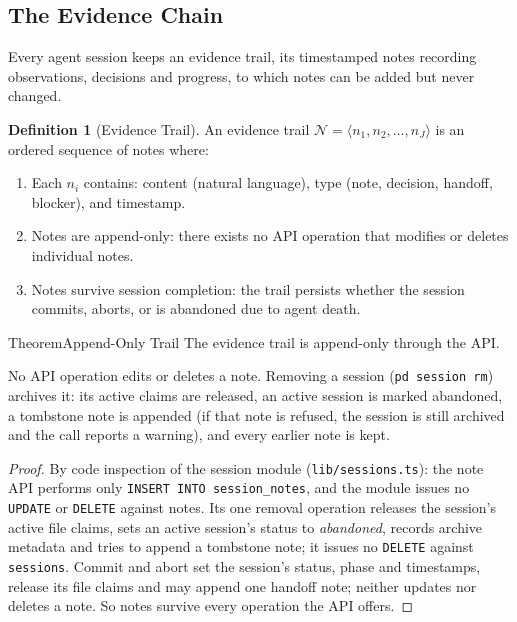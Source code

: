 \documentclass[11pt,a4paper]{article}
\theoremstyle{definition}
\newtheorem{definition}{Definition}[section]
\theoremstyle{remark}
\begin{document}
\subsection{The Evidence Chain}

Every agent session keeps an evidence trail, its timestamped notes recording observations, decisions and progress, to which notes can be added but never changed.

\begin{definition}[Evidence Trail]\label{def:evidence}
\setlength{\parskip}{4pt plus 1pt}
An evidence trail $\mathcal{N} = \langle n_1, n_2, \ldots, n_J \rangle$ is an ordered sequence of notes where:
\begin{enumerate}[nosep]
  \item Each $n_i$ contains: content (natural language), type (note, decision, handoff, blocker), and timestamp.


\item Notes are append-only: there exists no API operation that modifies or deletes individual notes.


\item Notes survive session completion: the trail persists whether the session commits, aborts, or is abandoned due to agent death.
\end{enumerate}
\end{definition}

\begin{pdclaim}{Theorem}{Append-Only Trail}
\setlength{\parskip}{4pt plus 1pt}
\label{lem:integrity}
The evidence trail is append-only through the API.

No API operation edits or deletes a note. Removing a session (\texttt{pd session rm}) archives it: its active claims are released, an active session is marked abandoned, a tombstone note is appended (if that note is refused, the session is still archived and the call reports a warning), and every earlier note is kept.
\end{pdclaim}

\begin{proof}
\setlength{\parskip}{4pt plus 1pt}
By code inspection of the session module (\texttt{lib/sessions.ts}): the note API performs only \texttt{INSERT INTO session\_notes}, and the module issues no \texttt{UPDATE} or \texttt{DELETE} against notes. Its one removal operation releases the session's active file claims, sets an active session's status to \emph{abandoned}, records archive metadata and tries to append a tombstone note; it issues no \texttt{DELETE} against \texttt{sessions}. Commit and abort set the session's status, phase and timestamps, release its file claims and may append one handoff note; neither updates nor deletes a note. So notes survive every operation the API offers.
\end{proof}
\end{document}
